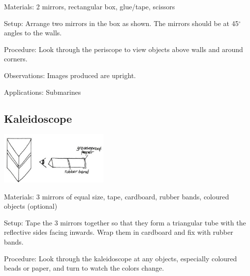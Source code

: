 \begin{multicols}{2}
\begin{description*}
\item[Materials:]{2 mirrors, rectangular box, glue/tape, scissors}
\item[Setup:]{Arrange two mirrors in the box as shown. The mirrors should be at 45$^\circ$ angles to the walls. }
\item[Procedure:]{Look through the periscope to view objects above walls and around corners.}
\item[Observations:]{Images produced are upright.}
\item[Applications:]{Submarines}
\end{description*}

\subsection{Kaleidoscope}

\begin{center}
\includegraphics[width=0.4\textwidth]{./img/vso/kaleidoscope.png}
\end{center}

\begin{description*}
\item[Materials:]{3 mirrors of equal size, tape, cardboard, rubber bands, coloured objects (optional)}
\item[Setup:]{Tape the 3 mirrors together so that they form a triangular tube with the reflective sides facing inwards. Wrap them in cardboard and fix with rubber bands.}
\item[Procedure:]{Look through the kaleidoscope at any objects, especially coloured beads or paper, and turn to watch the colors change.}
\end{description*}


\end{multicols}

\pagebreak